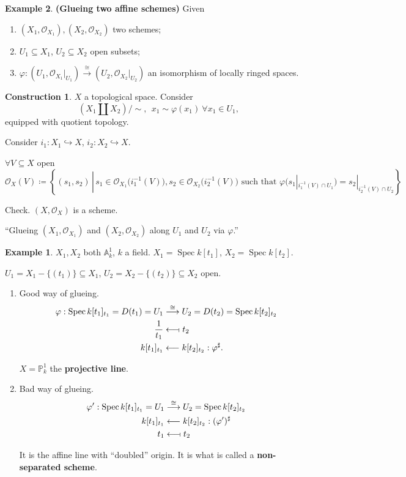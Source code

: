 \documentclass[12pt]{article}
\DeclareMathOperator{\Spec}{Spec}
\theoremstyle{definition}
\newtheorem*{example}{Example}
\newtheorem*{construction}{Construction}
\theoremstyle{remark}
\begin{document}
\begin{example}
\textbf{(Glueing two affine schemes)} Given
\begin{enumerate}[label=\arabic*)]
\item $(X_1,\mathcal{O}_{X_1}),(X_2,\mathcal{O}_{X_2})$ two schemes;
\item $U_1\subseteq X_1$, $U_2\subseteq X_2$ open subsets;
\item $\varphi:(U_1,\mathcal{O}_{X_1}|_{U_1})\xrightarrow{\cong}(U_2,\mathcal{O}_{X_2}|_{U_2})$ an isomorphism of locally ringed spaces.
\end{enumerate}

\begin{construction}
$X$ a topological space. Consider
\[\left(X_1\coprod X_2\right)/\sim,\ \ x_1\sim\varphi(x_1)\ \forall x_1\in U_1,\]
equipped with quotient topology.

Consider $i_1:X_1\hookrightarrow X$, $i_2:X_2\hookrightarrow X$.

$\forall V\subseteq X$ open
\[\mathcal{O}_X(V)\coloneqq\left\{(s_1,s_2)\,\left|\,s_1\in\mathcal{O}_{X_1}\big(i_1^{-1}(V)\big),s_2\in\mathcal{O}_{X_2}\big(i_2^{-1}(V)\big)\text{ such that }\varphi\big(s_1|_{i_1^{-1}(V)\cap U_1}\big)=s_2|_{i_2^{-1}(V)\cap U_2}\right.\right\}\]

Check. $(X,\mathcal{O}_X)$ is a scheme.
\end{construction}

``Glueing $(X_1,\mathcal{O}_{X_1})$ and $(X_2,\mathcal{O}_{X_2})$ along $U_1$ and $U_2$ via $\varphi$.''

\begin{example}
$X_1,X_2$ both $\mathbb{A}_k^1$, $k$ a field. $X_1=\Spec k[t_1]$, $X_2=\Spec k[t_2]$.

$U_1=X_1-\{(t_1)\}\subseteq X_1$, $U_2=X_2-\{(t_2)\}\subseteq X_2$ open.

\begin{enumerate}[label=\alph*)]
\item Good way of glueing.
\begin{align*}
\varphi:\Spec k[t_1]_{t_1}=D(t_1)=U_1&\overset{\cong}{\longrightarrow}U_2=D(t_2)=\Spec k[t_2]_{t_2}\\
\frac{1}{t_1}&\longleftarrow\!\shortmid t_2\\
k[t_1]_{t_1}&\longleftarrow k[t_2]_{t_2}:\varphi^{\sharp}.
\end{align*}

$X=\mathbb{P}_k^1$ the \textbf{projective line}.

\item Bad way of glueing.
\begin{align*}
\varphi':\Spec k[t_1]_{t_1}=U_1&\overset{\cong}{\longrightarrow}U_2=\Spec k[t_2]_{t_2}\\
k[t_1]_{t_1}&\longleftarrow k[t_2]_{t_2}:(\varphi')^{\sharp}\\
t_1&\longleftarrow\!\shortmid t_2
\end{align*}

It is the affine line with ``doubled'' origin. It is what is called a \textbf{non-separated scheme}.
\end{enumerate}
\end{example}
\end{example}
\end{document}
